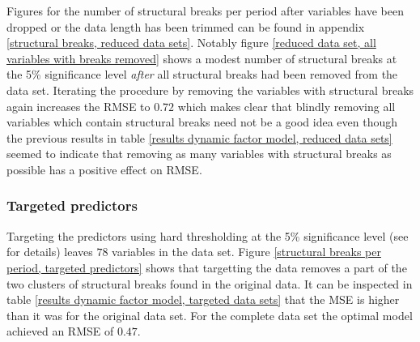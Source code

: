 \documentclass[12pt]{article}
\begin{document}
Figures for the number of structural breaks per period after variables have been dropped or the data length has been trimmed can be found in appendix \ref{structural breaks, reduced data sets}. Notably figure \ref{reduced data set, all variables with breaks removed} shows a modest number of structural breaks at the 5\% significance level \textit{after} all structural breaks had been removed from the data set. Iterating the procedure by removing the variables with structural breaks again increases the RMSE to $0.72$ which makes clear that blindly removing all variables which contain structural breaks need not be a good idea even though the previous results in table \ref{results dynamic factor model, reduced data sets} seemed to indicate that removing as many variables with structural breaks as possible has a positive effect on RMSE.

\subsubsection{Targeted predictors}
Targeting the predictors using hard thresholding at the 5\% significance level (see \citet{bai2008forecasting} for details) leaves $78$ variables in the data set. Figure \ref{structural breaks per period, targeted predictors} shows that targetting the data removes a part of the two clusters of structural breaks found in the original data. It can be inspected in table \ref{results dynamic factor model, targeted data sets} that the MSE is higher than it was for the original data set. For the complete data set the optimal model achieved an RMSE of $0.47$.
\end{document}
